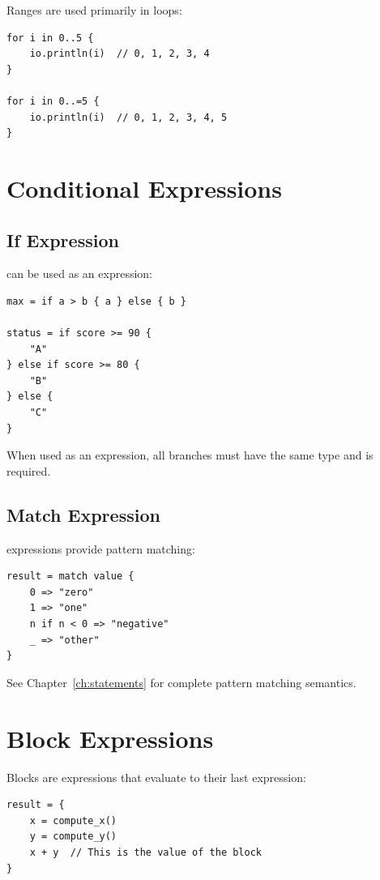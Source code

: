 Ranges are used primarily in  loops:

\begin{lstlisting}
for i in 0..5 {
    io.println(i)  // 0, 1, 2, 3, 4
}

for i in 0..=5 {
    io.println(i)  // 0, 1, 2, 3, 4, 5
}
\end{lstlisting}

\section{Conditional Expressions}

\subsection{If Expression}

 can be used as an expression:

\begin{lstlisting}
max = if a > b { a } else { b }

status = if score >= 90 {
    "A"
} else if score >= 80 {
    "B"
} else {
    "C"
}
\end{lstlisting}

\begin{warning}
When used as an expression, all branches must have the same type and  is required.
\end{warning}

\subsection{Match Expression}

 expressions provide pattern matching:

\begin{lstlisting}
result = match value {
    0 => "zero"
    1 => "one"
    n if n < 0 => "negative"
    _ => "other"
}
\end{lstlisting}

See Chapter~\ref{ch:statements} for complete pattern matching semantics.

\section{Block Expressions}

Blocks are expressions that evaluate to their last expression:

\begin{lstlisting}
result = {
    x = compute_x()
    y = compute_y()
    x + y  // This is the value of the block
}
\end{lstlisting}

